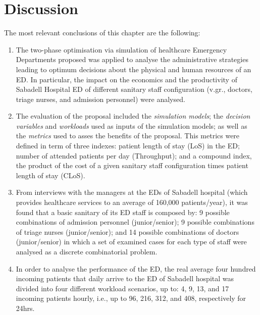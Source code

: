 \documentclass[11pt]{article} %
\begin{document}

\clearpage

\section{Discussion}

The most relevant conclusions of this chapter are the following:
\begin{enumerate}
\item The two-phase optimisation via simulation of healthcare Emergency
Departments proposed was applied to analyse the administrative strategies
leading to optimum decisions about the physical and human resources
of an ED. In particular, the impact on the economics and the productivity
of Sabadell Hospital ED of different sanitary staff configuration
(v.gr., doctors, triage nurses, and admission personnel) were analysed.\\

\item The evaluation of the proposal included the \textit{simulation models};
the \textit{decision variables} and\textit{ workloads} used as inputs
of the simulation models; as well as the \textit{metrics} used to
asses the benefits of the proposal. This metrics were defined in term
of three indexes: patient length of stay (LoS) in the ED; number of
attended patients per day (Throughput); and a compound index, the
product of the cost of a given sanitary staff configuration times
patient length of stay (CLoS).\\

\item From interviews with the managers at the EDs of Sabadell hospital
(which provides healthcare services to an average of 160,000 patients/year),
it was found that a basic sanitary of its ED staff is composed by:
9 possible combinations of admission personnel (junior/senior); 9
possible combinations of triage nurses (junior/senior); and 14 possible combinations
of doctors (junior/senior) in which a set of examined cases for each
type of staff were analysed as a discrete combinatorial problem.\\

\item In order to analyse the performance of the ED, the real average four
hundred incoming patients that daily arrive to the ED of Sabadell
hospital was divided into four different workload scenarios, up to:
4, 9, 13, and 17 incoming patients hourly, i.e., up to 96, 216, 312,
and 408, respectively for 24hrs.\\


\end{enumerate}
\end{document}
